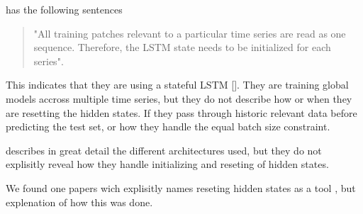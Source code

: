 \cite{Bandara2017} has the following sentences
\begin{quotation}
  "All training patches relevant to a particular time series are read as one
  sequence. Therefore, the LSTM state needs to be initialized for each
  series".

\end{quotation}
This indicates that they are using a stateful LSTM [].
They are training global models accross multiple time series, but they do not
describe how or when they are resetting the hidden states.
If they pass through historic relevant data before predicting
the test set, or how they handle the equal batch size constraint.

\cite{Hewamalage2021} describes in great detail the different architectures used,
but they do not explisitly reveal how they handle initializing and reseting
of hidden states.

We found one papers wich explisitly names reseting hidden states
as a tool \cite{Smyl2020}, but explenation of how this was done.



